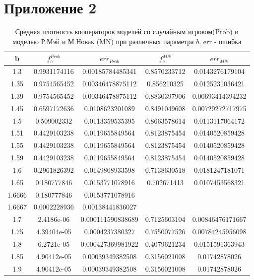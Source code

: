 \documentclass[12pt,a4paper]{article}
\begin{document}
 \section{Приложение 2}
 
 	\begin{center}
 		\begin{table}[H]
 			\centering
 			\begin{tabular}[H]{|c|c|c|c|c|}
 				\hline 
 				b&$f^{Prob}_{c}$& $err_{Prob}$&$f^{MN}_{c}$& $err_{MN}$ \\
 				\hline
 				1.3&0.9931174116&0.00185784485341&0.8570233712&0.0143276179104 \\ 
 				\hline 
 				1.35&0.9754565452&0.00346478875112&0.856210325&0.0125231036421 \\ 
 				\hline 
 				1.39&0.9754565452&0.00346478875112&0.8830397906&0.00693414394232 \\ 
 				\hline 
 				1.45&0.6597172636&0.0108623201089&0.8491049608&0.00729272717975 \\ 
 				\hline 
 				1.5&0.509002332&0.0113359535395&0.8663578614&0.0113117064172 \\ 
 				\hline 
 				1.51&0.4429103238&0.0119655849564&0.8123875454&0.0140520859428 \\ 
 				\hline 
 				1.55&0.4429103238&0.0119655849564&0.8123875454&0.0140520859428 \\ 
 				\hline 
 				1.59&0.4429103238&0.0119655849564&0.8123875454&0.0140520859428 \\ 
 				\hline 
 				1.6&0.2961826392&0.0149808933598&0.7138630518&0.0181247181071 \\ 
 				\hline 
 				1.65&0.180777846&0.0153771078916&0.702671413&0.0107453568321 \\ 
 				\hline 
 				1.6666&0.180777846&0.0153771078916&& \\ 
 				\hline 
 				1.6667&0.0002228936&0.00138441836027&& \\ 
 				\hline 
 				1.7&2.4186e-06&0.000111590838689&0.7125603104&0.00846476171667 \\ 
 				\hline 
 				1.75&4.39404e-05&0.0004237380327&0.7550077526&0.00784245956098 \\ 
 				\hline 
 				1.8&6.2721e-05&0.000427369981922&0.4079621234&0.0151591363943 \\ 
 				\hline 
 				1.85&4.90412e-05&0.00039349382508&0.3156021008&0.01742878026 \\ 
 				\hline 
 				1.9&4.90412e-05&0.00039349382508&0.3156021008&0.01742878026 \\
 				\hline		
 			\end{tabular}
 			\label{tab1}
 			\caption{Средняя плотность кооператоров моделей со случайным игроком(Prob) и моделью Р.Мэй и М.Новак (MN) при различных параметра $b$, err - ошибка}
 		\end{table}
 	\end{center}
\end{document}

